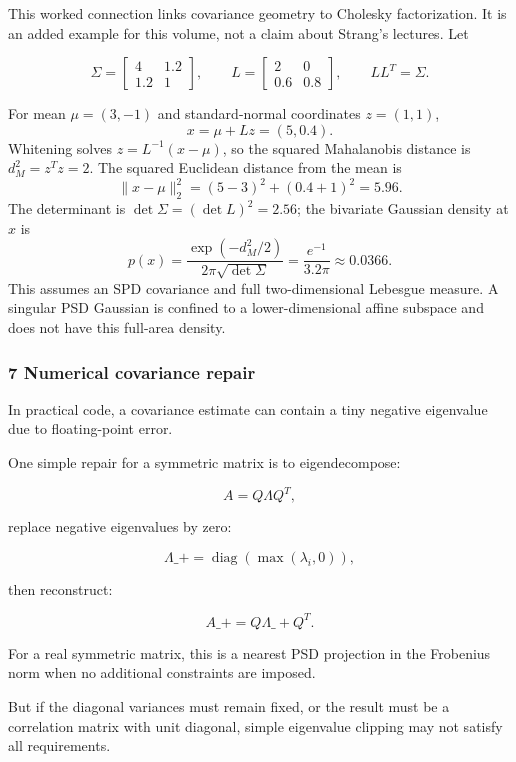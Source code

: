 This worked connection links covariance geometry to Cholesky factorization. It is an added example for this volume, not a claim about Strang's lectures. Let

\[
\Sigma=\begin{bmatrix}4&1.2\\1.2&1\end{bmatrix},
\qquad
L=\begin{bmatrix}2&0\\0.6&0.8\end{bmatrix},
\qquad
LL^T=\Sigma.
\]

For mean \(\mu=(3,-1)\) and standard-normal coordinates \(z=(1,1)\), \[
x=\mu+Lz=(5,0.4).
\] Whitening solves \(z=L^{-1}(x-\mu)\), so the squared Mahalanobis distance is \(d_M^2=z^Tz=2\). The squared Euclidean distance from the mean is \[
\|x-\mu\|_2^2=(5-3)^2+(0.4+1)^2=5.96.
\] The determinant is \(\det\Sigma=(\det L)^2=2.56\); the bivariate Gaussian density at \(x\) is \[
p(x)=\frac{\exp(-d_M^2/2)}{2\pi\sqrt{\det\Sigma}}=\frac{e^{-1}}{3.2\pi}\approx0.0366.
\] This assumes an SPD covariance and full two-dimensional Lebesgue measure. A singular PSD Gaussian is confined to a lower-dimensional affine subspace and does not have this full-area density.

\subsubsection{7 Numerical covariance repair}\label{02-foundations-ii-ch024-numerical-covariance-repair}

In practical code, a covariance estimate can contain a tiny negative eigenvalue due to floating-point error.

One simple repair for a symmetric matrix is to eigendecompose:

\[
 A=Q\Lambda Q^T,
\]

replace negative eigenvalues by zero:

\[
 \Lambda\_+= \operatorname{diag}(\max(\lambda_i,0)),
\]

then reconstruct:

\[
 \boxed{ A\_+=Q\Lambda\_+Q^T }.
\]

For a real symmetric matrix, this is a nearest PSD projection in the Frobenius norm when no additional constraints are imposed.

But if the diagonal variances must remain fixed, or the result must be a correlation matrix with unit diagonal, simple eigenvalue clipping may not satisfy all requirements.

